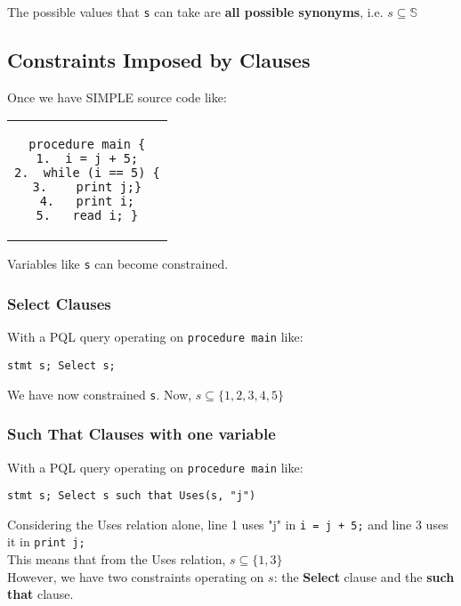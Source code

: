 \documentclass{article}
\begin{document}
The possible values that \texttt{s} can take are \textbf{all possible synonyms}, i.e. $s \subseteq \mathbb{S}$

\newpage

\subsection{Constraints Imposed by Clauses}

Once we have SIMPLE source code like:\\
\begin{center}
\begin{tabular}{c}
\begin{lstlisting}
procedure main {
1.  i = j + 5;
2.  while (i == 5) {
3.    print j;}
4.   print i;
5.   read i; }
\end{lstlisting}
\end{tabular}
\end{center}
\vspace{10pt} 

Variables like \texttt{s} can become constrained. 

\subsubsection{Select Clauses}
With a PQL query operating on \texttt{procedure main} like:
\begin{center}
\texttt{stmt s; Select s;}
\end{center}

We have now constrained \texttt{s}. Now, $s \subseteq \{1, 2, 3, 4, 5\}$

\subsubsection{Such That Clauses with one variable}
With a PQL query operating on \texttt{procedure main} like:
\begin{center}
\texttt{stmt s; Select s such that Uses(s, "j")}
\end{center}

Considering the Uses relation alone, line 1 uses "j" in \texttt{i = j + 5;} and line 3 uses it in \texttt{print j;}  \\

This means that from the Uses relation, $s \subseteq \{1, 3\}$ \\

However, we have two constraints operating on $s$: the \textbf{Select} clause and the \textbf{such that} clause. 
\end{document}

